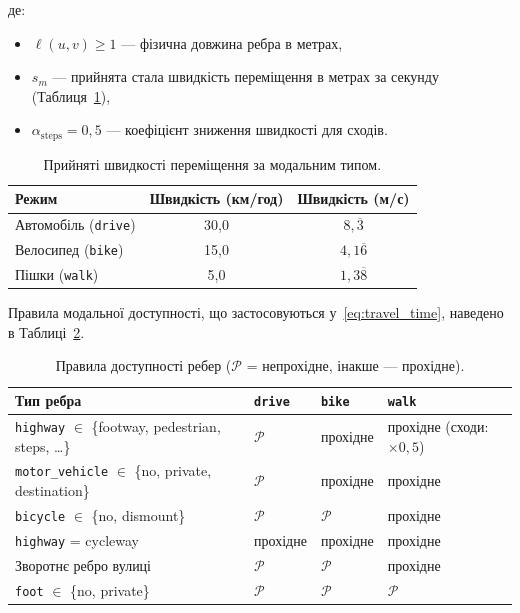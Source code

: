 \documentclass[12pt, a4paper]{article}
\theoremstyle{definition}
\begin{document}
\noindent де:
\begin{itemize}
  \item $\ell(u,v) \geq 1$ --- фізична довжина ребра в метрах,
  \item $s_m$ --- прийнята стала швидкість переміщення в метрах за секунду
        (Таблиця~\ref{tab:speeds}),
  \item $\alpha_{\text{steps}} = 0{,}5$ --- коефіцієнт зниження швидкості
        для сходів.
\end{itemize}

\begin{table}[h]
  \centering
  \caption{Прийняті швидкості переміщення за модальним типом.}
  \label{tab:speeds}
  \begin{tabular}{lcc}
    \toprule
    Режим & Швидкість (км/год) & Швидкість (м/с) \\
    \midrule
    Автомобіль (\texttt{drive}) & 30{,}0 & $8{,}\overline{3}$ \\
    Велосипед (\texttt{bike})   & 15{,}0 & $4{,}1\overline{6}$ \\
    Пішки (\texttt{walk})       & 5{,}0  & $1{,}3\overline{8}$ \\
    \bottomrule
  \end{tabular}
\end{table}

Правила модальної доступності, що застосовуються у~\eqref{eq:travel_time},
наведено в Таблиці~\ref{tab:modal_rules}.

\begin{table}[h]
	\centering
	\caption{Правила доступності ребер ($\mathcal{P}$ = непрохідне, інакше --- прохідне).}
	\label{tab:modal_rules}
	\small
	\begin{tabularx}{\textwidth}{lXXX}
		\toprule
		\textbf{Тип ребра} & \textbf{\texttt{drive}} & \textbf{\texttt{bike}} & \textbf{\texttt{walk}} \\
		\midrule
		\texttt{highway} $\in$ \{footway, pedestrian, steps, \dots\}
		& $\mathcal{P}$ & прохідне & прохідне (сходи: $\times 0{,}5$) \\
		\addlinespace %
		\texttt{motor\_vehicle} $\in$ \{no, private, destination\}
		& $\mathcal{P}$ & прохідне & прохідне \\
		\addlinespace
		\texttt{bicycle} $\in$ \{no, dismount\}
		& $\mathcal{P}$ & $\mathcal{P}$ & прохідне \\
		\addlinespace
		\texttt{highway} = cycleway
		& прохідне & прохідне & прохідне \\
		\addlinespace
		Зворотнє ребро вулиці
		& $\mathcal{P}$ & $\mathcal{P}$ & прохідне \\
		\addlinespace
		\texttt{foot} $\in$ \{no, private\}
		& $\mathcal{P}$ & $\mathcal{P}$ & $\mathcal{P}$ \\
		\bottomrule
	\end{tabularx}
\end{table}
\end{document}
